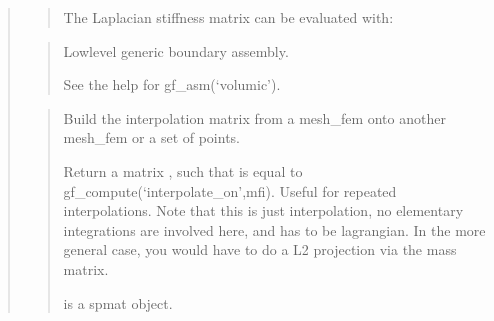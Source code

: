 \documentclass[a4paper,11pt,english]{sphinxmanual}
\begin{document}
\begin{quote}
\begin{quote}
\sphinxAtStartPar
The Laplacian stiffness matrix can be evaluated with:

\begin{sphinxVerbatim}[commandchars=\\\{\}]
      

 
\end{sphinxVerbatim}
\end{quote}

\sphinxAtStartPar
{}
\begin{quote}

\sphinxAtStartPar
Low\sphinxhyphen{}level generic boundary assembly.

\sphinxAtStartPar
See the help for gf\_asm(‘volumic’).
\end{quote}

\sphinxAtStartPar
{}
\begin{quote}

\sphinxAtStartPar
Build the interpolation matrix from a mesh\_fem onto another mesh\_fem or a set of points.

\sphinxAtStartPar
Return a matrix , such that  is equal to
gf\_compute(‘interpolate\_on’,mfi). Useful for repeated interpolations.
Note that this is just interpolation, no elementary integrations
are involved here, and  has to be lagrangian. In the more
general case, you would have to do a L2 projection via the mass
matrix.

\sphinxAtStartPar
{} is a spmat object.
\end{quote}


\end{quote}
\end{document}
